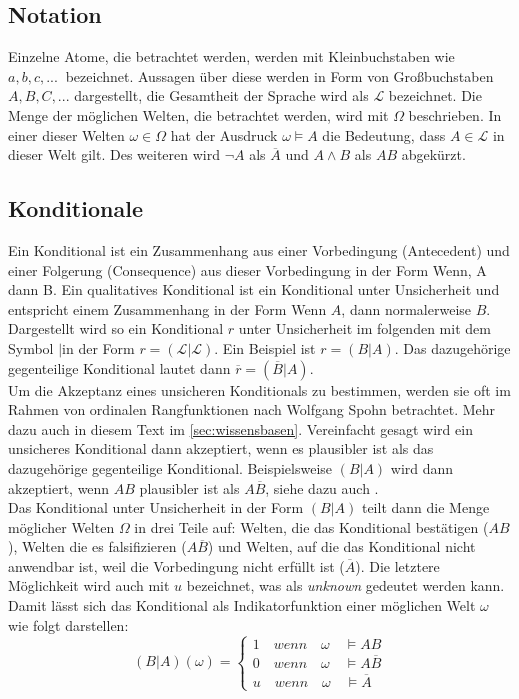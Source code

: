 \documentclass[12pt,a4paper]{article}
\newcommand{\lag}{\mathcal{L}}
\begin{document}
\subsection{Notation}
Einzelne Atome, die betrachtet werden, werden mit Kleinbuchstaben wie $a, b, c,...\ $ bezeichnet. Aussagen über diese werden in Form von Großbuchstaben $A, B, C,...$ dargestellt, die Gesamtheit der Sprache wird als $\lag$ bezeichnet. Die Menge der möglichen Welten, die betrachtet werden, wird mit $\Omega$ beschrieben. In einer dieser Welten $\omega \in \Omega$  hat der Ausdruck $\omega \models A$ die Bedeutung, dass $A \in \lag$ in dieser Welt gilt. Des weiteren wird $\neg A$ als $\overline{A}$ und $A \wedge B$ als $AB$ abgekürzt.
\subsection{Konditionale}
Ein Konditional ist ein Zusammenhang aus einer Vorbedingung (Antecedent) und einer Folgerung (Consequence) aus dieser Vorbedingung in der Form \glqq Wenn, A dann B\grqq . Ein qualitatives Konditional ist ein Konditional unter Unsicherheit und entspricht einem Zusammenhang in der Form \glqq Wenn $A$, dann normalerweise $B$\grqq . Dargestellt wird so ein Konditional $r$ unter Unsicherheit im folgenden mit dem Symbol \glqq$|$\grqq \space in der Form $r = ( \lag | \lag)$. Ein Beispiel ist $r = (B|A)$. Das dazugehörige gegenteilige Konditional lautet dann $\overline{r} = (\overline{B}|A)$.\\
Um die Akzeptanz eines unsicheren Konditionals zu bestimmen, werden sie oft im Rahmen von ordinalen Rangfunktionen nach Wolfgang Spohn betrachtet. Mehr dazu auch in diesem Text im  \autoref{sec:wissensbasen}. Vereinfacht gesagt wird ein unsicheres Konditional dann  akzeptiert, wenn es plausibler ist als das dazugehörige gegenteilige Konditional. Beispielsweise $(B|A)$ wird  dann akzeptiert, wenn $A B$ plausibler ist als $A \overline{B}$, siehe dazu auch \cite{isberner14}. \\
Das Konditional unter Unsicherheit in der Form $(B|A)$ teilt dann die Menge möglicher Welten $\Omega$ in drei Teile auf: Welten, die das Konditional bestätigen ($A B$), Welten die es falsifizieren ($A \overline{B}$) und Welten, auf die das Konditional nicht anwendbar ist, weil die Vorbedingung nicht erfüllt ist ($\overline{A}$). Die letztere Möglichkeit wird auch mit $u$ bezeichnet, was als \textit{unknown} gedeutet werden kann. Damit lässt sich das Konditional als Indikatorfunktion einer möglichen Welt $\omega$ wie folgt darstellen:
\[
  (B|A)(\omega)=\begin{cases}
               1 \quad wenn \quad \omega \quad \models AB\\
               0 \quad wenn \quad \omega \quad \models A\overline{B}\\
               u \quad wenn \quad \omega \quad \models \overline{A}
            \end{cases}
\]
\end{document}
